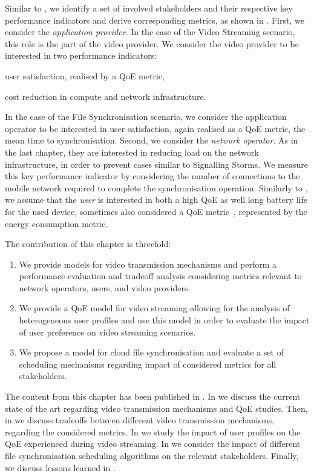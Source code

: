 Similar to , we identify a set of involved stakeholders and their respective key performance indicators and derive corresponding metrics, as shown in .
First, we consider the \emph{application provider}. 
In the case of the Video Streaming scenario, this role is the part of the video provider.
We consider the video provider to be interested in two performance indicators: 
\begin{enumerate*}
\item user satisfaction, realised by a \gls{QoE} metric,
\item cost reduction in compute and network infrastructure.
\end{enumerate*}
In the case of the File Synchronisation scenario, we consider the application operator to be interested in user satisfaction, again realised as a \gls{QoE} metric, the mean time to synchronisation.
Second, we consider the \emph{network operator}.
As in the last chapter, they are interested in reducing load on the network infrastructure, in order to prevent cases similar to Signalling Storms.
We measure this key performance indicator by considering the number of connections to the mobile network required to complete the synchronisation operation.
Similarly to , we assume that the \emph{user} is interested in both a high \gls{QoE} as well long battery life for the used device, sometimes also considered a \gls{QoE} metric~\cite{Ickin2012}, represented by the energy consumption metric. 

The contribution of this chapter is threefold:
\begin{enumerate}
\item We provide models for video transmission mechanisms and perform a performance evaluation and tradeoff analysis considering metrics relevant to network operators, users, and video providers.
\item We provide a \gls{QoE} model for video streaming allowing for the analysis of heterogeneous user profiles and use this model in order to evaluate the impact of user preference on video streaming scenarios.
\item We propose a model for cloud file synchronisation and evaluate a set of scheduling mechanisms regarding impact of considered metrics for all stakeholders.
\end{enumerate}

The content from this chapter has been published in \cite{Schwartz2013b, Hossfeld2015, Schwartz2014a}.
In  we discuss the current state of the art regarding video transmission mechanisms and \gls{QoE} studies.
Then, in  we discuss tradeoffs between different video transmission mechanisms, regarding the considered metrics.
In  we study the impact of user profiles on the \gls{QoE} experienced during video streaming.
In  we consider the impact of different file synchronisation scheduling algorithms on the relevant stakeholders.
Finally, we discuss lessons learned in .





